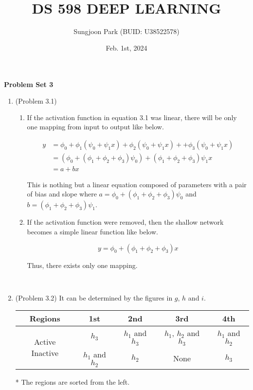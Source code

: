 \documentclass[10pt]{article}
\title{DS 598 DEEP LEARNING}
\author{Sungjoon Park (BUID: U38522578)}
\date{Feb. 1st, 2024}
\begin{document}
\maketitle

\setlength{\parindent}{0cm}
\setlength{\parskip}{2mm}

\textbf{Problem Set 3}

\begin{enumerate}

\item (Problem 3.1)
	\begin{enumerate}[label=(\alph*)]
	\item If the activation function in equation 3.1 was linear, there will be only one mapping from input to output like below.

	\begin{align*}
	y &= \phi_0+\phi_1(\psi_0+\psi_1x)+\phi_2(\psi_0+\psi_1x)++\phi_3(\psi_0+\psi_1x) \\
	&= (\phi_0+(\phi_1+\phi_2+\phi_3)\psi_0)+(\phi_1+\phi_2+\phi_3)\psi_1x \\
	&= a+bx
	\end{align*}
	
	This is nothing but a linear equation composed of parameters with a pair of bias and slope where $a=\phi_0+(\phi_1+\phi_2+\phi_3)\psi_0$ and $b=(\phi_1+\phi_2+\phi_3)\psi_1$.
	
	\item If the activation function were removed, then the shallow network becomes a simple linear function like below.
	
	$$y=\phi_0+(\phi_1+\phi_2+\phi_3)x$$
	
	Thus, there exists only one mapping.
	
	\end{enumerate}

\

\item (Problem 3.2) It can be determined by the figures in $g$, $h$ and $i$.
	\begin{center}
	\begin{tabular}{ |c|c|c|c|c| } 
	\hline
	Regions & 1st & 2nd & 3rd & 4th \\
	\hline
	\multirow{2}{4em}{Active Inactive} & $h_3$ & $h_1$ and $h_3$ & $h_1$, $h_2$ and $h_3$ & $h_1$ and $h_2$ \\ 
	& $h_1$ and $h_2$ & $h_2$ & None & $h_3$ \\ 
	\hline
	\end{tabular}
	\end{center}
	* The regions are sorted from the left.


\end{enumerate}
\end{document}
